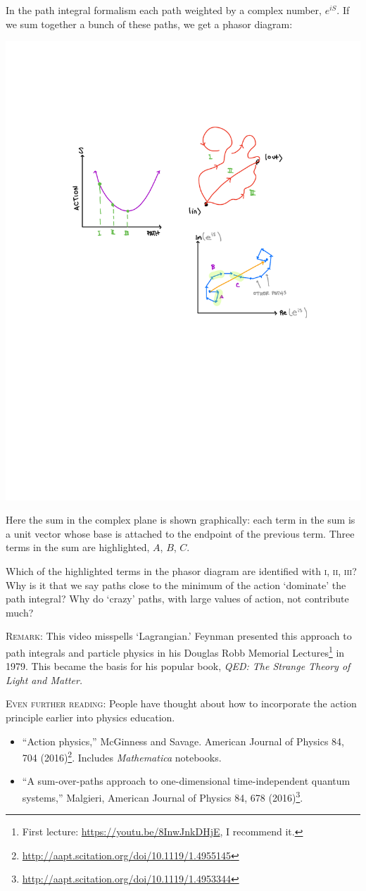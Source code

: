 \documentclass[12pt]{article}
\begin{document}
In the path integral formalism each path weighted by a complex number, $e^{iS}$. If we sum together a bunch of these paths, we get a phasor diagram:
\begin{center}
	\includegraphics[width=.5\textwidth]{HW4b}
\end{center}
Here the sum in the complex plane is shown graphically: each term in the sum is a unit vector whose base is attached to the endpoint of the previous term. Three terms in the sum are highlighted, $A$, $B$, $C$.

Which of the highlighted terms in the phasor diagram are identified with \textsc{i, ii, iii}? Why is it that we say paths close to the minimum of the action `dominate' the path integral? Why do `crazy' paths, with large values of action, not contribute much?



\textsc{Remark}: This video misspells `Lagrangian.' Feynman presented this approach to path integrals and particle physics in his  Douglas Robb Memorial Lectures\footnote{First lecture: \url{https://youtu.be/8InwJnkDHjE}, I recommend it.} in 1979. This became the basis for his popular book, \emph{QED: The Strange Theory of Light and Matter.}

\textsc{Even further reading}: People have thought about how to incorporate the action principle earlier into physics education. 
\begin{itemize}
	\item ``Action physics,'' McGinness and Savage. American Journal of Physics 84, 704 (2016)\footnote{\url{http://aapt.scitation.org/doi/10.1119/1.4955145}}. Includes \emph{Mathematica} notebooks.
	\item ``A sum-over-paths approach to one-dimensional time-independent quantum systems,'' Malgieri, American Journal of Physics 84, 678 (2016)\footnote{\url{http://aapt.scitation.org/doi/10.1119/1.4953344}}. 
\end{itemize}
\end{document}
